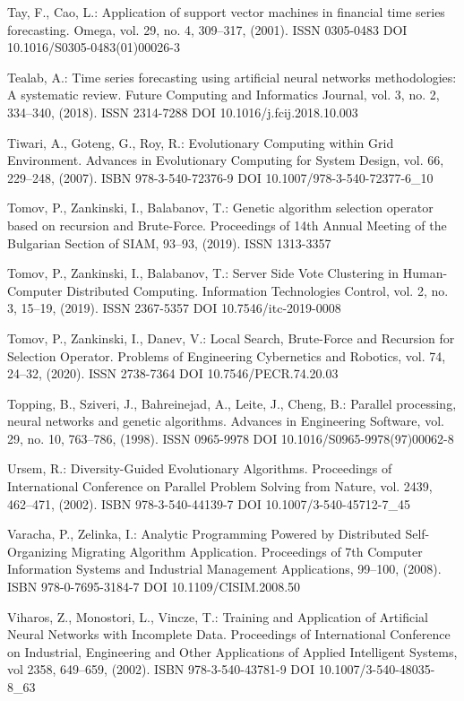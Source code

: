 \begin{thebibliography}{99.}
 Tay, F., Cao, L.: Application of support vector machines in financial time series forecasting. Omega, vol. 29, no. 4, 309--317, (2001). ISSN 0305-0483 DOI 10.1016/S0305-0483(01)00026-3

 Tealab, A.: Time series forecasting using artificial neural networks methodologies: A systematic review. Future Computing and Informatics Journal, vol. 3, no. 2, 334--340, (2018). ISSN 2314-7288 DOI 10.1016/j.fcij.2018.10.003

 Tiwari, A., Goteng, G., Roy, R.: Evolutionary Computing within Grid Environment. Advances in Evolutionary Computing for System Design, vol. 66, 229--248, (2007). ISBN 978-3-540-72376-9 DOI 10.1007/978-3-540-72377-6\_10

 Tomov, P., Zankinski, I., Balabanov, T.: Genetic algorithm selection operator based on recursion and Brute-Force. Proceedings of 14th Annual Meeting of the Bulgarian Section of SIAM, 93--93, (2019). ISSN 1313-3357

 Tomov, P., Zankinski, I., Balabanov, T.: Server Side Vote Clustering in Human-Computer Distributed Computing. Information Technologies Control, vol. 2, no. 3, 15--19, (2019). ISSN 2367-5357 DOI 10.7546/itc-2019-0008

 Tomov, P., Zankinski, I., Danev, V.: Local Search, Brute-Force and Recursion for Selection Operator. Problems of Engineering Cybernetics and Robotics, vol. 74, 24--32, (2020). ISSN 2738-7364 DOI 10.7546/PECR.74.20.03

 Topping, B., Sziveri, J., Bahreinejad, A., Leite, J., Cheng, B.: Parallel processing, neural networks and genetic algorithms. Advances in Engineering Software, vol. 29, no. 10, 763--786, (1998). ISSN 0965-9978 DOI 10.1016/S0965-9978(97)00062-8

 Ursem, R.: Diversity-Guided Evolutionary Algorithms. Proceedings of International Conference on Parallel Problem Solving from Nature, vol. 2439, 462--471, (2002). ISBN 978-3-540-44139-7 DOI 10.1007/3-540-45712-7\_45

 Varacha, P., Zelinka, I.: Analytic Programming Powered by Distributed Self-Organizing Migrating Algorithm Application. Proceedings of 7th Computer Information Systems and Industrial Management Applications, 99--100, (2008). ISBN 978-0-7695-3184-7 DOI 10.1109/CISIM.2008.50

 Viharos, Z., Monostori, L., Vincze, T.: Training and Application of Artificial Neural Networks with Incomplete Data. Proceedings of International Conference on Industrial, Engineering and Other Applications of Applied Intelligent Systems, vol 2358, 649--659, (2002). ISBN 978-3-540-43781-9 DOI 10.1007/3-540-48035-8\_63


\end{thebibliography}
